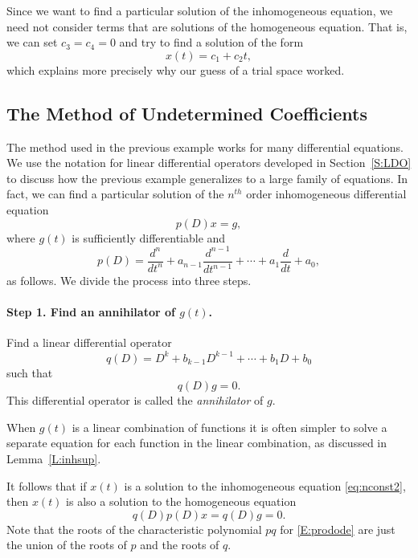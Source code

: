 \documentclass{ximera}
\begin{document}
Since we want to find a particular solution 
of the inhomogeneous equation, 
we need not consider terms that are solutions of the homogeneous equation. 
That is, we can set $c_3=c_4=0$ and try to find a solution of the form
\[
x(t) = c_1 + c_2 t,
\]
which explains more precisely why our guess of a trial space worked.


\subsection*{The Method of Undetermined Coefficients}

The method used in the previous example works for many differential 
equations.  We use the notation for 
linear differential operators 
developed in Section~\ref{S:LDO} to discuss how the previous example 
generalizes to a large family of equations.  In fact, we can find a 
particular solution of the $n^{th}$ order inhomogeneous differential equation 
\begin{equation}  \label{eq:nconst2}
p(D)x = g,
\end{equation}
where $g(t)$ is sufficiently differentiable and 
\[
p(D) = \frac{d^n}{dt^n} + a_{n-1}\frac{d^{n-1}}{dt^{n-1}} + \cdots + 
a_1\frac{d}{dt}+a_0,
\]
as follows.  We divide the process into three steps.

\paragraph{Step 1. Find an annihilator of $g(t)$.} 
Find a linear differential operator 
\[
q(D) = D^k + b_{k-1}D^{k-1} + \cdots + b_1D+b_0
\]
such that 
\begin{equation}  \label{eq:undetcoeffb}
q(D)g = 0.
\end{equation}
This differential operator is called the {\em annihilator\/} of $g$. 

  When $g(t)$ is a linear combination of functions
it is often simpler to solve a separate equation for each function in the 
linear combination, as discussed in Lemma~\ref{L:inhsup}.

It follows that if $x(t)$ is a solution to the 
inhomogeneous equation \eqref{eq:nconst2}, then $x(t)$ is 
also a solution to the homogeneous equation 
\begin{equation}  \label{E:prodode}
q(D)p(D)x = q(D)g = 0.
\end{equation}
Note that the roots of the 
characteristic 
polynomial 
$pq$ for \eqref{E:prodode}
are just the union of the roots of $p$ and the roots of $q$.  
\end{document}
